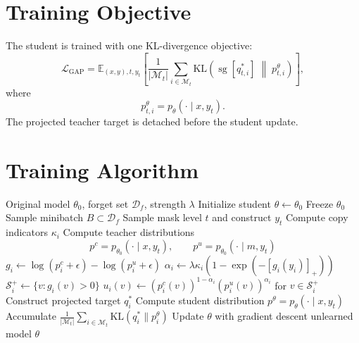 \documentclass[10pt]{article}
\begin{document}
\section{Training Objective}

The student is trained with one KL-divergence objective:
\begin{equation}
\mathcal{L}_{\mathrm{GAP}}
=
\mathbb{E}_{(x,y),t,y_t}
\left[
\frac{1}{|\mathcal{M}_t|}
\sum_{i\in\mathcal{M}_t}
\mathrm{KL}
\left(
\operatorname{sg}[q^*_{t,i}]
\;\middle\|\;
p^\theta_{t,i}
\right)
\right],
\end{equation}
where
\begin{equation}
p^\theta_{t,i}=p_\theta(\cdot\mid x,y_t).
\end{equation}
The projected teacher target is detached before the student update.

\section{Training Algorithm}

\begin{algorithm}[h]
\caption{GAP-DLM Retain-Free Unlearning}
\begin{algorithmic}[1]
\Require Original model $\theta_0$, forget set $\mathcal{D}_f$, strength $\lambda$
\State Initialize student $\theta\leftarrow\theta_0$
\State Freeze $\theta_0$
    \State Sample minibatch $B\subset\mathcal{D}_f$
        \State Sample mask level $t$ and construct $y_t$
        \State Compute copy indicators $\kappa_i$
        \State Compute teacher distributions
        \[
        p^c=p_{\theta_0}(\cdot\mid x,y_t),
        \qquad
        p^u=p_{\theta_0}(\cdot\mid m,y_t)
        \]
            \State $g_i\leftarrow\log(p^c_i+\epsilon)-\log(p^u_i+\epsilon)$
            \State $\alpha_i\leftarrow
            \lambda\kappa_i(1-\exp(-[g_i(y_i)]_+))$
            \State $\mathcal{S}^+_i\leftarrow\{v:g_i(v)>0\}$
            \State $u_i(v)\leftarrow
            (p^c_i(v))^{1-\alpha_i}(p^u_i(v))^{\alpha_i}$
            for $v\in\mathcal{S}^+_i$
            \State Construct projected target $q^*_i$
        \EndFor
        \State Compute student distribution $p^\theta=p_\theta(\cdot\mid x,y_t)$
        \State Accumulate
        $\frac{1}{|\mathcal{M}_t|}\sum_{i\in\mathcal{M}_t}
        \mathrm{KL}(q^*_i\|p^\theta_i)$
    \EndFor
    \State Update $\theta$ with gradient descent
\EndFor
\State \Return unlearned model $\theta$
\end{algorithmic}
\end{algorithm}
\end{document}

